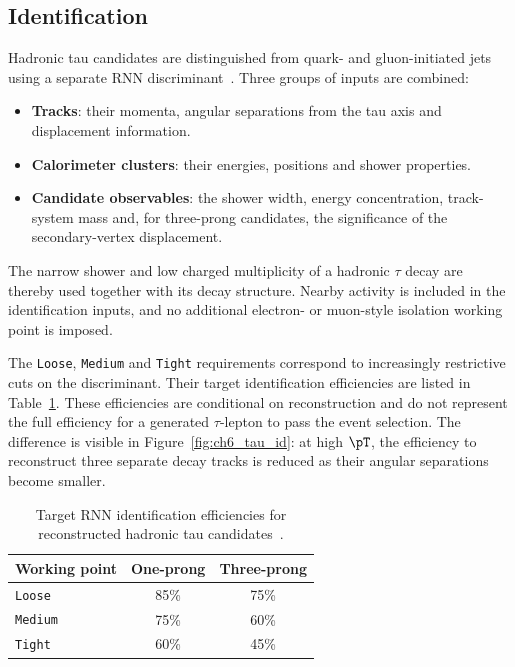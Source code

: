 \subsection{Identification}

Hadronic tau candidates are distinguished from quark- and gluon-initiated jets using a separate RNN discriminant~\cite{ATLAS2019TauRNN,ATLAS2022TauR22}.
Three groups of inputs are combined:
\begin{itemize}
    \item \textbf{Tracks}: their momenta, angular separations from the tau axis and displacement information.
    \item \textbf{Calorimeter clusters}: their energies, positions and shower properties.
    \item \textbf{Candidate observables}: the shower width, energy concentration, track-system mass and, for three-prong candidates, the significance of the secondary-vertex displacement.
\end{itemize}
The narrow shower and low charged multiplicity of a hadronic $\tau$ decay are thereby used together with its decay structure.
Nearby activity is included in the identification inputs, and no additional electron- or muon-style isolation working point is imposed.

The \texttt{Loose}, \texttt{Medium} and \texttt{Tight} requirements correspond to increasingly restrictive cuts on the discriminant.
Their target identification efficiencies are listed in Table~\ref{tab:ch6_tau_id}.
These efficiencies are conditional on reconstruction and do not represent the full efficiency for a generated $\tau$-lepton to pass the event selection.
The difference is visible in Figure~\ref{fig:ch6_tau_id}: at high $\pT$, the efficiency to reconstruct three separate decay tracks is reduced as their angular separations become smaller.

\begin{table}[htbp]
    \centering
    \caption[Target efficiencies of the hadronic tau identification working points]{Target RNN identification efficiencies for reconstructed hadronic tau candidates~\cite{ATLAS2022TauR22}.}
    \label{tab:ch6_tau_id}
    \begin{tabular}{lcc}
        \toprule
        Working point & One-prong & Three-prong \\
        \midrule
        \texttt{Loose} & 85\% & 75\% \\
        \texttt{Medium} & 75\% & 60\% \\
        \texttt{Tight} & 60\% & 45\% \\
        \bottomrule
    \end{tabular}
\end{table}

